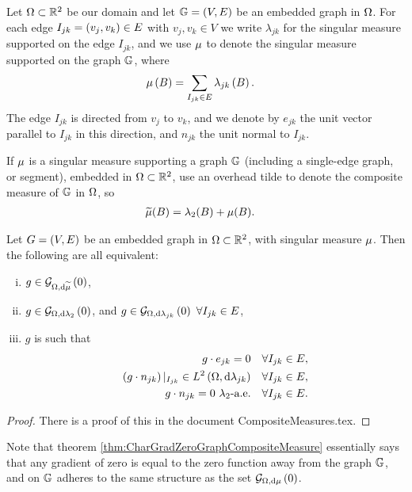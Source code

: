 \documentclass[11pt]{report}
\begin{document}
Let $\Omega\subset\mathbb{R}^2$ be our domain and let $\mathbb{G}=\left( V,E \right)$ be an embedded graph in $\Omega$.
For each edge $I_{jk}=\left( v_j,v_k \right)\in E$ with $v_j,v_k\in V$ we write $\lambda_{jk}$ for the singular measure supported on the edge $I_{jk}$, and we use $\mu$ to denote the singular measure supported on the graph $\mathbb{G}$, where
\begin{align*}
	\mu\left( B \right) &= \sum_{I_{jk}\in E}\lambda_{jk}\left( B \right).
\end{align*}
The edge $I_{jk}$ is directed from $v_j$ to $v_k$, and we denote by $e_{jk}$ the unit vector parallel to $I_{jk}$ in this direction, and $n_{jk}$ the unit normal to $I_{jk}$.

\begin{convention} \label{conv:CompMeasNotation}
	If $\mu$ is a singular measure supporting a graph $\mathbb{G}$ (including a single-edge graph, or segment), embedded in $\Omega\subset\mathbb{R}^2$, use an overhead tilde to denote the composite measure of $\mathbb{G}$ in $\Omega$, so
	\begin{align*}
		\widetilde{\mu}(B) &= \lambda_2(B) + \mu(B).
	\end{align*}
\end{convention}

\begin{theorem} \label{thm:CharGradZeroGraphCompositeMeasure}
	Let $G=\left( V,E \right)$ be an embedded graph in $\Omega\subset\mathbb{R}^2$, with singular measure $\mu$.
	Then the following are all equivalent:
	\begin{enumerate}[(i)]
		\item $g\in\mathcal{G}_{ \Omega, \mathrm{d}\widetilde{\mu}}\left( 0 \right)$,
		\item $g\in\mathcal{G}_{ \Omega, \mathrm{d}\lambda_2}\left( 0 \right)$, and $g\in\mathcal{G}_{ \Omega, \mathrm{d}\lambda_{jk}}\left( 0 \right) \ \forall I_{jk}\in E$,
		\item $g$ is such that
		\begin{align*}
			g\cdot e_{jk} = 0 &\quad \forall I_{jk}\in E, \\
			\left( g\cdot n_{jk} \right)\vert_{I_{jk}} \in L^{2}\left( \Omega,\mathrm{d}\lambda_{jk} \right) &\quad \forall I_{jk}\in E, \\
			g\cdot n_{jk} = 0 \ \lambda_2\text{-a.e.} &\quad \forall I_{jk}\in E.
		\end{align*}
	\end{enumerate}
\end{theorem}
\begin{proof}
	There is a proof of this in the document CompositeMeasures.tex.
\end{proof}
Note that theorem \ref{thm:CharGradZeroGraphCompositeMeasure} essentially says that any gradient of zero is equal to the zero function away from the graph $\mathbb{G}$, and on $\mathbb{G}$ adheres to the same structure as the set $\mathcal{G}_{ \Omega, \mathrm{d}\mu}\left( 0 \right)$.
\end{document}
